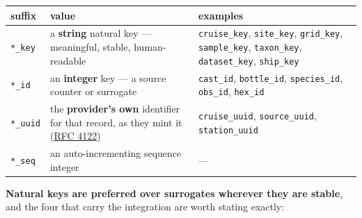 \documentclass[
  letterpaper,
  DIV=11,
  numbers=noendperiod]{scrreprt}
\begin{document}
\begin{longtable}[]{@{}
  >{\raggedright\arraybackslash}p{}
  >{\raggedright\arraybackslash}p{}
  >{\raggedright\arraybackslash}p{}@{}}
\toprule\noalign{}
\begin{minipage}[b]{\linewidth}\raggedright
suffix
\end{minipage} & \begin{minipage}[b]{\linewidth}\raggedright
value
\end{minipage} & \begin{minipage}[b]{\linewidth}\raggedright
examples
\end{minipage} \\
\midrule\noalign{}
\endhead
\bottomrule\noalign{}
\endlastfoot
\texttt{*\_key} & a \textbf{string} natural key --- meaningful, stable,
human-readable & \texttt{cruise\_key}, \texttt{site\_key},
\texttt{grid\_key}, \texttt{sample\_key}, \texttt{taxon\_key},
\texttt{dataset\_key}, \texttt{ship\_key} \\
\texttt{*\_id} & an \textbf{integer} key --- a source counter or
surrogate & \texttt{cast\_id}, \texttt{bottle\_id},
\texttt{species\_id}, \texttt{obs\_id}, \texttt{hex\_id} \\
\texttt{*\_uuid} & the \textbf{provider's own} identifier for that
record, as they mint it
(\href{https://datatracker.ietf.org/doc/html/rfc4122}{RFC 4122}) &
\texttt{cruise\_uuid}, \texttt{source\_uuid}, \texttt{station\_uuid} \\
\texttt{*\_seq} & an auto-incrementing sequence integer & --- \\
\end{longtable}

\textbf{Natural keys are preferred over surrogates wherever they are
stable}, and the four that carry the integration are worth stating
exactly:
\end{document}
